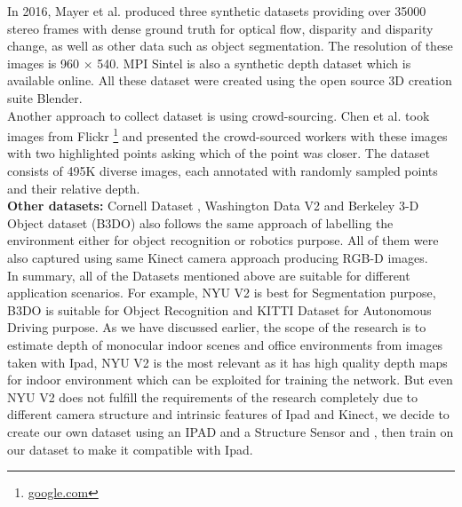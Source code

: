 In 2016, Mayer et al. \cite{MIFDB16} produced three synthetic datasets providing over 35000 stereo frames with dense ground truth for optical flow, disparity and disparity change, as well as other data such as object segmentation. The resolution of these images is 960 $\times$ 540. MPI Sintel \cite{Butler:ECCV:2012} is also a synthetic depth dataset which is available online. All these dataset were created using the open source 3D creation suite Blender.\\

Another approach to collect dataset is using crowd-sourcing. Chen et al. \cite{DBLP:journals/corr/ChenFYD16} took images from Flickr \footnote{ \url{google.com}}  and presented the crowd-sourced workers with these images with two highlighted points asking which of the point was closer. The dataset consists of 495K diverse images, each annotated with randomly sampled points and their relative depth.\\

\textbf{Other datasets:} Cornell Dataset \cite{3Dscene} , Washington Data V2 \cite{Washington} and  Berkeley 3-D Object dataset (B3DO) \cite{Janoch:EECS-2012-85} also follows the same approach of labelling the environment either for object recognition or robotics purpose. All of them were also captured using same Kinect camera approach producing RGB-D images.\\

In summary, all of the Datasets mentioned above are suitable for different application scenarios. For example, NYU V2 \cite{Silberman:ECCV12} is best for Segmentation purpose, B3DO \cite{Janoch:EECS-2012-85} is suitable for Object Recognition and KITTI Dataset \cite{Geiger2013IJRR} for Autonomous Driving purpose. As we have discussed earlier, the scope of the research is to estimate depth of monocular indoor scenes and office environments from  images taken with Ipad, NYU V2 is the most relevant as it has high quality depth maps for indoor environment which can be exploited for training the network. But even NYU V2 does not fulfill the requirements of the research completely due to different camera structure and intrinsic features of Ipad and Kinect, we decide to create our own dataset using an IPAD and a Structure Sensor and   , then train on our dataset to make it compatible with Ipad.





